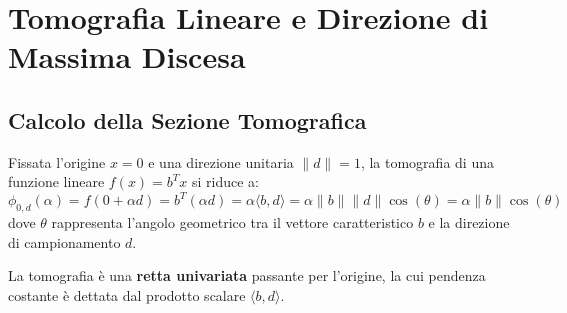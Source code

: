 \FloatBarrier
\section{Tomografia Lineare e Direzione di Massima Discesa}
\label{sec:opt-tomografia-lineare-antigradiente}

\subsection{Calcolo della Sezione Tomografica}
Fissata l'origine $x = 0$ e una direzione unitaria $\|d\| = 1$, la tomografia di una funzione lineare $f(x) = b^T x$ si riduce a:
\begin{equation}
\phi_{0, d}(\alpha) = f(0 + \alpha d) = b^T (\alpha d) = \alpha \langle b, d \rangle = \alpha \|b\| \|d\| \cos(\theta) = \alpha \|b\| \cos(\theta)
\end{equation}
dove $\theta$ rappresenta l'angolo geometrico tra il vettore caratteristico $b$ e la direzione di campionamento $d$.

La tomografia \`e una \textbf{retta univariata} passante per l'origine, la cui pendenza costante \`e dettata dal prodotto scalare $\langle b, d \rangle$.

